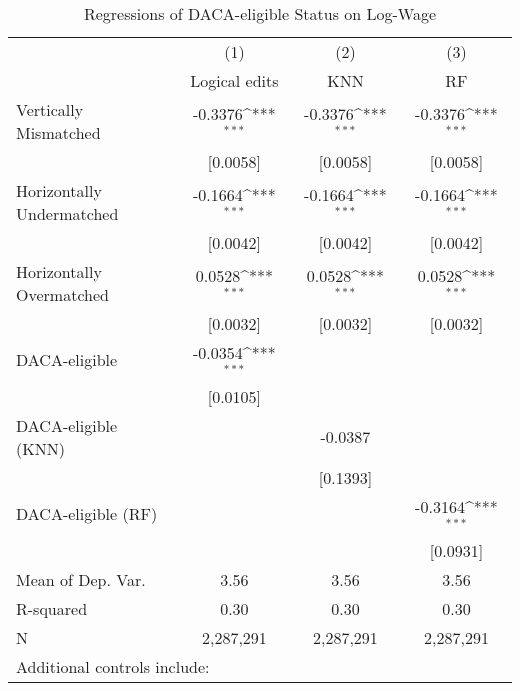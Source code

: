 \begin{table}[htbp]\centering
\def\sym#1{\ifmmode^{#1}\else\(^{#1}\)\fi}
\caption{Regressions of DACA-eligible Status on Log-Wage}
\begin{tabular}{l*{3}{c}}
\toprule
                    &\multicolumn{1}{c}{(1)}         &\multicolumn{1}{c}{(2)}         &\multicolumn{1}{c}{(3)}         \\
                    &Logical edits         &         KNN         &          RF         \\
\midrule
Vertically Mismatched&     -0.3376\sym{***}&     -0.3376\sym{***}&     -0.3376\sym{***}\\
                    &    [0.0058]         &    [0.0058]         &    [0.0058]         \\
\addlinespace
Horizontally Undermatched&     -0.1664\sym{***}&     -0.1664\sym{***}&     -0.1664\sym{***}\\
                    &    [0.0042]         &    [0.0042]         &    [0.0042]         \\
\addlinespace
Horizontally Overmatched&      0.0528\sym{***}&      0.0528\sym{***}&      0.0528\sym{***}\\
                    &    [0.0032]         &    [0.0032]         &    [0.0032]         \\
\addlinespace
DACA-eligible       &     -0.0354\sym{***}&                     &                     \\
                    &    [0.0105]         &                     &                     \\
\addlinespace
DACA-eligible (KNN) &                     &     -0.0387         &                     \\
                    &                     &    [0.1393]         &                     \\
\addlinespace
DACA-eligible (RF)  &                     &                     &     -0.3164\sym{***}\\
                    &                     &                     &    [0.0931]         \\
\midrule
Mean of Dep. Var.   &        3.56         &        3.56         &        3.56         \\
R-squared           &        0.30         &        0.30         &        0.30         \\
N                   &   2,287,291         &   2,287,291         &   2,287,291         \\
\bottomrule
\multicolumn{4}{l}{\footnotesize Additional controls include:}\\

\end{tabular}
\end{table}
